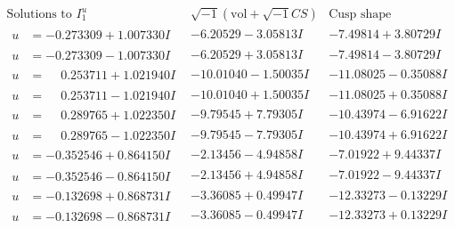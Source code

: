 \documentclass[1p]{elsarticle_modified}
\theoremstyle{definition}
\newcommand{\I}{\sqrt{-1}}
\begin{document}
$$\begin{array}{c|c|c}  
\text{Solutions to }I^u_{1}& \I (\text{vol} + \sqrt{-1}CS) & \text{Cusp shape}\\
 \hline 
\begin{aligned}
u &= -0.273309 + 1.007330 I\end{aligned}
 & -6.20529 - 3.05813 I & -7.49814 + 3.80729 I \\ \hline\begin{aligned}
u &= -0.273309 - 1.007330 I\end{aligned}
 & -6.20529 + 3.05813 I & -7.49814 - 3.80729 I \\ \hline\begin{aligned}
u &= \phantom{-}0.253711 + 1.021940 I\end{aligned}
 & -10.01040 - 1.50035 I & -11.08025 - 0.35088 I \\ \hline\begin{aligned}
u &= \phantom{-}0.253711 - 1.021940 I\end{aligned}
 & -10.01040 + 1.50035 I & -11.08025 + 0.35088 I \\ \hline\begin{aligned}
u &= \phantom{-}0.289765 + 1.022350 I\end{aligned}
 & -9.79545 + 7.79305 I & -10.43974 - 6.91622 I \\ \hline\begin{aligned}
u &= \phantom{-}0.289765 - 1.022350 I\end{aligned}
 & -9.79545 - 7.79305 I & -10.43974 + 6.91622 I \\ \hline\begin{aligned}
u &= -0.352546 + 0.864150 I\end{aligned}
 & -2.13456 - 4.94858 I & -7.01922 + 9.44337 I \\ \hline\begin{aligned}
u &= -0.352546 - 0.864150 I\end{aligned}
 & -2.13456 + 4.94858 I & -7.01922 - 9.44337 I \\ \hline\begin{aligned}
u &= -0.132698 + 0.868731 I\end{aligned}
 & -3.36085 + 0.49947 I & -12.33273 - 0.13229 I \\ \hline\begin{aligned}
u &= -0.132698 - 0.868731 I\end{aligned}
 & -3.36085 - 0.49947 I & -12.33273 + 0.13229 I \\ \hline\begin{aligned}

\end{aligned}
\end{array}$$
\end{document}
